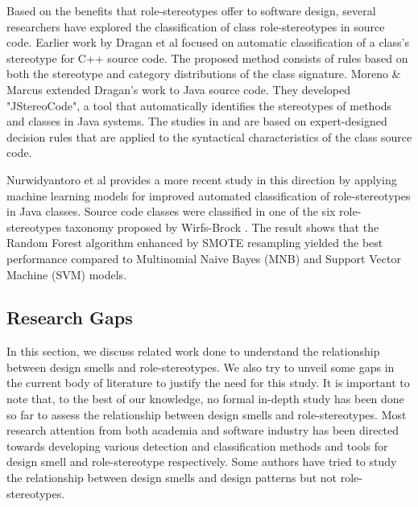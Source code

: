 \documentclass[AMA,Times1COL]{WileyNJDv5} %
\begin{document}
Based on the benefits that role-stereotypes offer to software design, several researchers have explored the classification of class role-stereotypes in source code. Earlier work by Dragan et al \cite{dragan2010automatic} focused on automatic classification of a class's stereotype for C++ source code. The proposed method consists of rules based on both the stereotype and category distributions of the class signature. Moreno \& Marcus\cite{moreno2012jstereocode} extended Dragan's work to Java source code. 
They developed "JStereoCode", a tool that automatically identifies the stereotypes of methods and classes in Java systems. The studies in \cite{dragan2010automatic} and \cite{moreno2012jstereocode} are based on expert-designed decision rules that are applied to the syntactical characteristics of the class source code.

Nurwidyantoro et al \cite{nurwidyantoro2019automated} provides a more recent study in this direction by applying machine learning models for improved automated classification of role-stereotypes in Java classes. Source code classes were classified in one of the six role-stereotypes taxonomy proposed by Wirfs-Brock \cite{wirfs2006characterizing}. The result shows that the Random Forest algorithm enhanced by SMOTE resampling yielded the best performance compared to Multinomial Naive Bayes (MNB) and Support Vector Machine (SVM) models.


\subsection{Research Gaps}
In this section, we discuss related work done to understand the relationship between design smells and role-stereotypes. We also try to unveil some gaps in the current body of literature to justify the need for this study. It is important to note that, to the best of our knowledge, no formal in-depth study has been done so far to assess the relationship between design smells and role-stereotypes. Most research attention from both academia and software industry has been directed towards developing various detection and classification methods and tools for design smell and role-stereotype respectively. Some authors have tried to study the relationship between design smells and design patterns \cite{jaafar2014analysing, walter2016relationship, sousa2018systematic, santos2022building} but not role-stereotypes.
\end{document}
